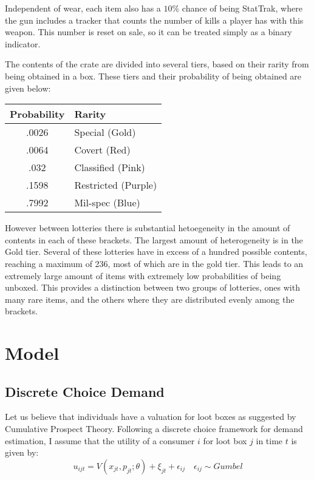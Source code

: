 \documentclass[12pt]{paper}
\begin{document}
Independent of wear, each item
also has a $10\%$ chance of being StatTrak\texttrademark, where the
gun includes a tracker that counts the number of kills a player has
with this weapon. This number is reset on sale, so it can be treated
simply as a binary indicator.

The contents of the crate are divided into several tiers, based on
their rarity from being obtained in a box. These tiers and their
probability of being obtained are given below:

\begin{center}
\begin{tabular}{|c|l|}\hline
Probability & Rarity\\\hline
.0026 & Special (Gold)\\
.0064 & Covert (Red)\\
.032 & Classified (Pink)\\
.1598 & Restricted (Purple)\\
.7992 & Mil-spec (Blue)\\\hline
\end{tabular}
\end{center}

However between lotteries there is substantial hetoegeneity in the
amount of contents in each of these brackets. The largest amount of
heterogeneity is in the Gold tier.  Several of these lotteries have in
excess of a hundred possible contents, reaching a maximum of 236, most
of which are in the gold tier. This leads to an extremely large amount
of items with extremely low probabilities of being unboxed. This
provides a distinction between two groups of lotteries, ones with many
rare items, and the others where they are distributed evenly among the
brackets. 

\section{Model}

\subsection{Discrete Choice Demand}

Let us believe that individuals have a valuation for loot boxes as
suggested by Cumulative Prospect Theory. Following a discrete choice
framework for demand estimation, I assume that the utility of a
consumer $i$ for loot box $j$ in time $t$ is given by:
\begin{equation*}
  u_{ijt} = V( x_{jt}, p_{jt}; \theta ) + \xi_{jt} + \epsilon_{ij} \quad \epsilon_{ij} \sim Gumbel
\end{equation*}
\end{document}
